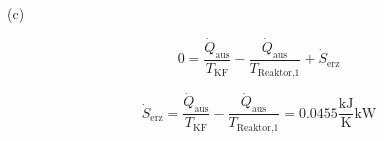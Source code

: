 (c) 

\[
0 = \frac{\dot{Q}_{\text{aus}}}{T_{\text{KF}}} - \frac{\dot{Q}_{\text{aus}}}{T_{\text{Reaktor,1}}} + \dot{S}_{\text{erz}}
\]

\[
\dot{S}_{\text{erz}} = \frac{\dot{Q}_{\text{aus}}}{T_{\text{KF}}} - \frac{\dot{Q}_{\text{aus}}}{T_{\text{Reaktor,1}}} = 0.0455 \frac{\text{kJ}}{\text{K}} \text{kW}
\]